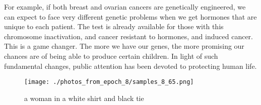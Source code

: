 \documentclass{article}%
\begin{document}
For example, if both breast and ovarian cancers are genetically engineered, we can expect to face very different genetic problems when we get hormones that are unique to each patient. The test is already available for those with this chromosome inactivation, and cancer resistant to hormones, and induced cancer.\newline%
This is a game changer. The more we have our genes, the more promising our chances are of being able to produce certain children.\newline%
In light of such fundamental changes, public attention has been devoted to protecting human life.\newline%

%


\begin{figure}[h!]%
\centering%
\texttt{[image: ./photos\_from\_epoch\_8/samples\_8\_65.png]}%
\caption{a woman in a white shirt and black tie}%
\end{figure}

%
\end{document}
